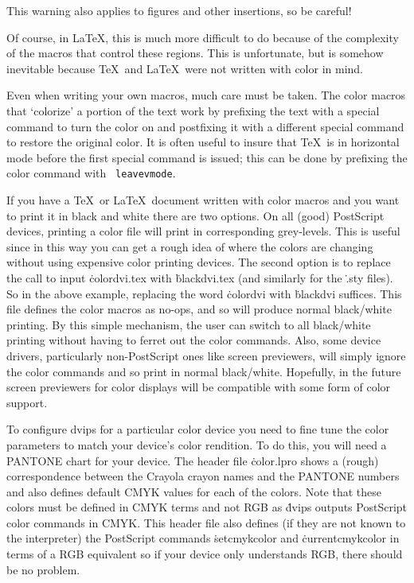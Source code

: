 This warning also applies to figures and other insertions, so be
careful!

Of course, in La\TeX, this is much more difficult to do because of the
complexity of the macros that control these regions.  This is
unfortunate, but is somehow inevitable because \TeX\ and La\TeX\ were
not written with color in mind.

Even when writing your own macros, much care must be taken.  The
color macros that `colorize' a portion of the text work by prefixing
the text with a special command to turn the color on and postfixing it
with a different special command to restore the original color.
It is often useful to insure that \TeX\ is in horizontal mode before
the first special command is issued; this can be done by prefixing the
color command with {\tt{} leavevmode}.


If you have a \TeX\ or La\TeX\ document written with color macros and
you want to print it in black and white there are two options.	On all
(good) PostScript devices, printing a color file will print in
corresponding grey-levels.  This is useful since in this way you can
get a rough idea of where the colors are changing without using
expensive color printing devices.  The second option is to replace the
call to input \.{colordvi.tex} with \.{blackdvi.tex} (and similarly for the
\.{.sty} files).  So in the above example, replacing the word
\.{colordvi} with \.{blackdvi} suffices.  This file defines the color macros
as no-ops, and so will produce normal black/white printing.  By this
simple mechanism, the user can switch to all black/white printing
without having to ferret out the color commands.  Also, some device
drivers, particularly non-PostScript ones like screen previewers, will
simply ignore the color commands and so print in normal black/white.
Hopefully, in the future screen previewers for color displays will be
compatible with some form of color support.


To configure dvips for a particular color device you need to fine tune
the color parameters to match your device's color rendition.  To do
this, you will need a PANTONE chart for your device.  The header file
\.{color.lpro} shows a (rough) correspondence between the Crayola
crayon names and the PANTONE numbers and also defines default CMYK
values for each of the colors.	Note that these colors must be defined
in CMYK terms and not RGB as \.{dvips} outputs PostScript color
commands in CMYK.  This header file also defines (if they are not
known to the interpreter) the PostScript commands \.{setcmykcolor} and
\.{currentcmykcolor} in terms of a RGB equivalent so if your device
only understands RGB, there should be no problem.


